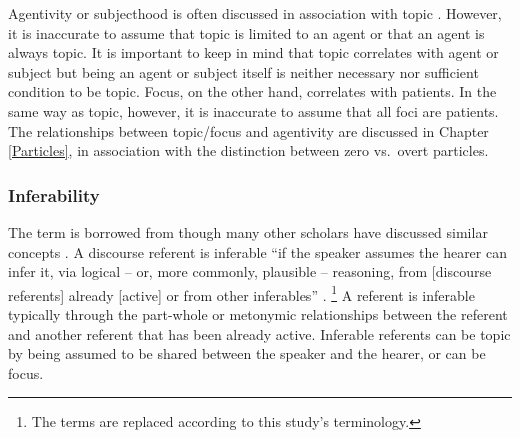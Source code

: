 Agentivity or subjecthood is often discussed in association with topic \cite[][inter alia]{li76}.
However, it is inaccurate to assume that topic is limited to an agent
or that an agent is always topic.
It is important to keep in mind that
topic correlates with agent or subject
but being an agent or subject itself is neither necessary nor sufficient condition to be topic.
Focus, on the other hand, correlates with patients.
In the same way as topic, however,
it is inaccurate to assume that all foci are patients.
The relationships between topic/focus and agentivity are discussed in Chapter \ref{Particles},
in association with the distinction between zero vs.\ overt particles.


\subsubsection{Inferability}


The term  is borrowed from 
though many other scholars have discussed similar concepts \cite[e.g.,][]{havilandclark74,chafe94}.
A discourse referent is inferable
``if the speaker assumes the hearer can infer it, via logical --  or, more commonly, plausible -- reasoning, from [discourse referents] already [active] or from other inferables'' \cite[][p.\ 236]{prince81}.%
	\footnote{
	The terms are replaced according to this study's terminology.
	}
A referent is inferable typically through
the part-whole or metonymic relationships between the referent and another referent that has been already active.
Inferable referents can be topic
by being assumed to be shared between the speaker and the hearer,
or can be focus.



%
%

